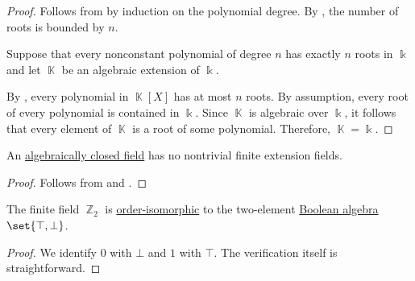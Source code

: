 \begin{proof}
   Follows from  by induction on the polynomial degree. By , the number of roots is bounded by \( n \).

   Suppose that every nonconstant polynomial of degree \( n \) has exactly \( n \) roots in \( \Bbbk \) and let \( \BbbK \) be an algebraic extension of \( \Bbbk \).

  By , every polynomial in \( \BbbK[X] \) has at most \( n \) roots. By assumption, every root of every polynomial is contained in \( \Bbbk \). Since \( \BbbK \) is algebraic over \( \Bbbk \), it follows that every element of \( \BbbK \) is a root of some polynomial. Therefore, \( \BbbK = \Bbbk \).
\end{proof}

\begin{proposition}\label{thm:no_finite_extensions_of_closed_fields}
  An \hyperref[def:algebraically_closed_field]{algebraically closed field} has no nontrivial finite extension fields.
\end{proposition}
\begin{proof}
  Follows from  and .
\end{proof}

\begin{proposition}\label{thm:f2_is_boolean_algebra}
  The finite field \( \BbbZ_2 \) is \hyperref[def:partially_ordered_set/homomorphism]{order-isomorphic} to the two-element \hyperref[def:boolean_algebra/trivial]{Boolean algebra} \( \set{ \top, \bot } \).
\end{proposition}
\begin{proof}
  We identify \( 0 \) with \( \bot \) and \( 1 \) with \( \top \). The verification itself is straightforward.
\end{proof}

